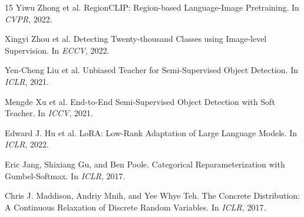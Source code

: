 \documentclass[10pt]{article}
\begin{document}
\begin{thebibliography}{15}
Yiwu Zhong et al.
\newblock RegionCLIP: Region-based Language-Image Pretraining.
\newblock In \emph{CVPR}, 2022.

Xingyi Zhou et al.
\newblock Detecting Twenty-thousand Classes using Image-level Supervision.
\newblock In \emph{ECCV}, 2022.

Yen-Cheng Liu et al.
\newblock Unbiased Teacher for Semi-Supervised Object Detection.
\newblock In \emph{ICLR}, 2021.

Mengde Xu et al.
\newblock End-to-End Semi-Supervised Object Detection with Soft Teacher.
\newblock In \emph{ICCV}, 2021.

Edward J. Hu et al.
\newblock LoRA: Low-Rank Adaptation of Large Language Models.
\newblock In \emph{ICLR}, 2022.

Eric Jang, Shixiang Gu, and Ben Poole.
\newblock Categorical Reparameterization with Gumbel-Softmax.
\newblock In \emph{ICLR}, 2017.

Chris J. Maddison, Andriy Mnih, and Yee Whye Teh.
\newblock The Concrete Distribution: A Continuous Relaxation of Discrete Random Variables.
\newblock In \emph{ICLR}, 2017.

\end{thebibliography}
\end{document}
